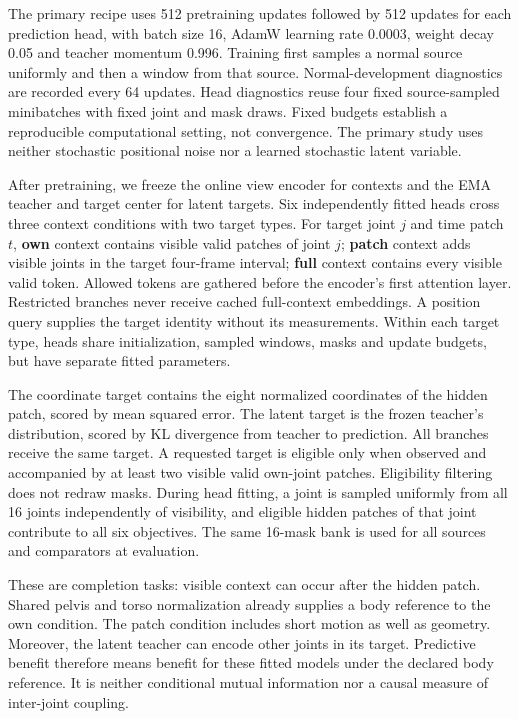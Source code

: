 \documentclass[letterpaper]{article}
\begin{document}
The primary recipe uses 512 pretraining updates followed by 512 updates for each prediction head, with batch size 16, AdamW learning rate 0.0003, weight decay 0.05 and teacher momentum 0.996. Training first samples a normal source uniformly and then a window from that source. Normal-development diagnostics are recorded every 64 updates. Head diagnostics reuse four fixed source-sampled minibatches with fixed joint and mask draws. Fixed budgets establish a reproducible computational setting, not convergence. The primary study uses neither stochastic positional noise nor a learned stochastic latent variable.

After pretraining, we freeze the online view encoder for contexts and the EMA teacher and target center for latent targets. Six independently fitted heads cross three context conditions with two target types. For target joint \(j\) and time patch \(t\), \textbf{own} context contains visible valid patches of joint \(j\); \textbf{patch} context adds visible joints in the target four-frame interval; \textbf{full} context contains every visible valid token. Allowed tokens are gathered before the encoder's first attention layer. Restricted branches never receive cached full-context embeddings. A position query supplies the target identity without its measurements. Within each target type, heads share initialization, sampled windows, masks and update budgets, but have separate fitted parameters.

The coordinate target contains the eight normalized coordinates of the hidden patch, scored by mean squared error. The latent target is the frozen teacher's distribution, scored by KL divergence from teacher to prediction. All branches receive the same target. A requested target is eligible only when observed and accompanied by at least two visible valid own-joint patches. Eligibility filtering does not redraw masks. During head fitting, a joint is sampled uniformly from all 16 joints independently of visibility, and eligible hidden patches of that joint contribute to all six objectives. The same 16-mask bank is used for all sources and comparators at evaluation.

These are completion tasks: visible context can occur after the hidden patch. Shared pelvis and torso normalization already supplies a body reference to the own condition. The patch condition includes short motion as well as geometry. Moreover, the latent teacher can encode other joints in its target. Predictive benefit therefore means benefit for these fitted models under the declared body reference. It is neither conditional mutual information nor a causal measure of inter-joint coupling.
\end{document}
